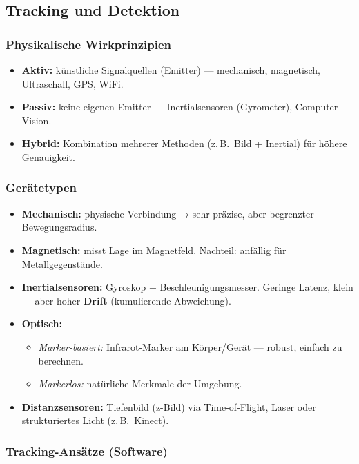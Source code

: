 \documentclass[12pt, a4paper]{article}
\begin{document}
\subsection{Tracking und Detektion}

\subsubsection*{Physikalische Wirkprinzipien}
\begin{itemize}
  \item \textbf{Aktiv:} künstliche Signalquellen (Emitter) — mechanisch, magnetisch, Ultraschall, GPS, WiFi.
  \item \textbf{Passiv:} keine eigenen Emitter — Inertialsensoren (Gyrometer), Computer Vision.
  \item \textbf{Hybrid:} Kombination mehrerer Methoden (z.\,B.\ Bild + Inertial) für höhere Genauigkeit.
\end{itemize}

\subsubsection*{Gerätetypen}
\begin{itemize}
  \item \textbf{Mechanisch:} physische Verbindung → sehr präzise, aber begrenzter Bewegungsradius.
  \item \textbf{Magnetisch:} misst Lage im Magnetfeld. Nachteil: anfällig für Metallgegenstände.
  \item \textbf{Inertialsensoren:} Gyroskop + Beschleunigungsmesser. Geringe Latenz, klein — aber hoher \textbf{Drift} (kumulierende Abweichung).
  \item \textbf{Optisch:}
    \begin{itemize}
      \item \textit{Marker-basiert:} Infrarot-Marker am Körper/Gerät — robust, einfach zu berechnen.
      \item \textit{Markerlos:} natürliche Merkmale der Umgebung.
    \end{itemize}
  \item \textbf{Distanzsensoren:} Tiefenbild (z-Bild) via Time-of-Flight, Laser oder strukturiertes Licht (z.\,B.\ Kinect).
\end{itemize}

\subsubsection*{Tracking-Ansätze (Software)}
\end{document}

